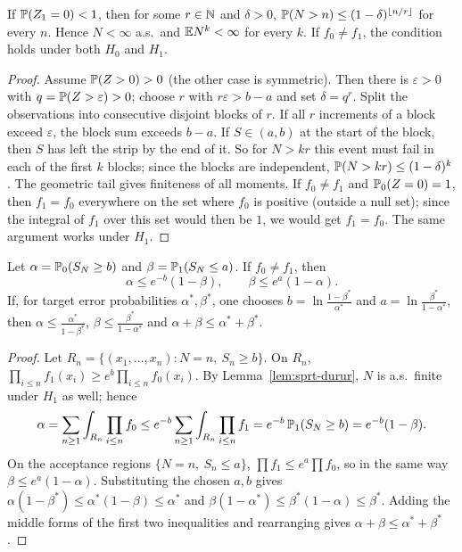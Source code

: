 \documentclass[main.tex]{subfiles}
\begin{document}
\begin{lemma}\label{lem:sprt-durur}
If $\P(Z_1=0)<1$, then for some $r\in\N$ and $\delta>0$, $\P(N>n)\le(1-\delta)^{\lfloor n/r\rfloor}$ for every $n$. Hence $N<\infty$ a.s.\ and $\E N^k<\infty$ for every $k$. If $f_0\ne f_1$, the condition holds under both $H_0$ and $H_1$.
\end{lemma}
\begin{proof}
Assume $\P(Z>0)>0$ (the other case is symmetric). Then there is $\varepsilon>0$ with $q=\P(Z>\varepsilon)>0$; choose $r$ with $r\varepsilon>b-a$ and set $\delta=q^r$. Split the observations into consecutive disjoint blocks of $r$. If all $r$ increments of a block exceed $\varepsilon$, the block sum exceeds $b-a$. If $S\in(a,b)$ at the start of the block, then $S$ has left the strip by the end of it. So for $N>kr$ this event must fail in each of the first $k$ blocks; since the blocks are independent, $\P(N>kr)\le(1-\delta)^k$. The geometric tail gives finiteness of all moments. If $f_0\ne f_1$ and $\P_0(Z=0)=1$, then $f_1=f_0$ everywhere on the set where $f_0$ is positive (outside a null set); since the integral of $f_1$ over this set would then be $1$, we would get $f_1=f_0$. The same argument works under $H_1$.
\end{proof}

\begin{theorem}\label{thm:wald-sinirlar}
Let $\alpha=\P_0(S_N\ge b)$ and $\beta=\P_1(S_N\le a)$. If $f_0\ne f_1$, then
\[
\alpha\le e^{-b}(1-\beta),\qquad\beta\le e^{a}(1-\alpha).
\]
If, for target error probabilities $\alpha^*,\beta^*$, one chooses $b=\ln\frac{1-\beta^*}{\alpha^*}$ and $a=\ln\frac{\beta^*}{1-\alpha^*}$, then $\alpha\le\frac{\alpha^*}{1-\beta^*}$, $\beta\le\frac{\beta^*}{1-\alpha^*}$ and $\alpha+\beta\le\alpha^*+\beta^*$.
\end{theorem}
\begin{proof}
Let $R_n=\{(x_1,\dots,x_n):N=n,\ S_n\ge b\}$. On $R_n$, $\prod_{i\le n}f_1(x_i)\ge e^b\prod_{i\le n}f_0(x_i)$. By Lemma~\ref{lem:sprt-durur}, $N$ is a.s.\ finite under $H_1$ as well; hence
\[
\alpha=\sum_{n\ge1}\int_{R_n}\prod_{i\le n}f_0\le e^{-b}\sum_{n\ge1}\int_{R_n}\prod_{i\le n}f_1=e^{-b}\,\P_1(S_N\ge b)=e^{-b}(1-\beta).
\]
On the acceptance regions $\{N=n,\ S_n\le a\}$, $\prod f_1\le e^a\prod f_0$, so in the same way $\beta\le e^a(1-\alpha)$. Substituting the chosen $a,b$ gives $\alpha(1-\beta^*)\le\alpha^*(1-\beta)\le\alpha^*$ and $\beta(1-\alpha^*)\le\beta^*(1-\alpha)\le\beta^*$. Adding the middle forms of the first two inequalities and rearranging gives $\alpha+\beta\le\alpha^*+\beta^*$.
\end{proof}
\end{document}
